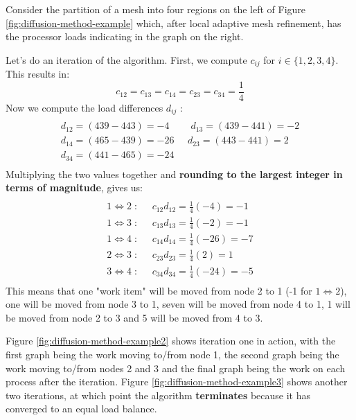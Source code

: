 \documentclass{article}
\begin{document}
Consider the partition of a mesh into four regions on the left of Figure \ref{fig:diffusion-method-example} which, after local adaptive mesh refinement, has the processor loads indicating in the graph on the right.

Let's do an iteration of the algorithm. First, we compute $c_{ij}$ for $i \in \lbrace 1, 2, 3, 4 \rbrace$. This results in:
\begin{equation}
	c_{12} = c_{13} = c_{14} = c_{23} = c_{34} = \frac{1}{4}
\end{equation}
Now we compute the load differences $d_{ij}$ :
\begin{multline} \\
	d_{12} = (439 - 443) = -4 \;\;\;\;\;\;\;\; d_{13} = (439 - 441) = -2 \\
	d_{14} = (465 - 439) = -26 \;\;\;\;\; d_{23} = (443 - 441) = 2 \\
	d_{34} = (441 - 465) = -24 \\
\end{multline}
Multiplying the two values together and \textbf{rounding to the largest integer in terms of magnitude}, gives us:
\begin{multline} \\
	1 \iff 2 \; : \;\;\;\;\; c_{12}d_{12} = \frac{1}{4}(-4) = -1 \\
	1 \iff 3 \; : \;\;\;\;\; c_{13}d_{13} = \frac{1}{4}(-2) = -1 \\
	1 \iff 4 \; : \;\;\;\;\; c_{14}d_{14} = \frac{1}{4}(-26) = -7 \\
	2 \iff 3 \; : \;\;\;\;\; c_{23}d_{23} = \frac{1}{4}(2) = 1 \\
	3 \iff 4 \; : \;\;\;\;\; c_{34}d_{34} = \frac{1}{4}(-24) = -5 \\
\end{multline}
This means that one "work item" will be moved from node 2 to 1 (-1 for $1 \iff 2$), one will be moved from node 3 to 1, seven will be moved from node 4 to 1, 1 will be moved from node 2 to 3 and 5 will be moved from 4 to 3.

Figure \ref{fig:diffusion-method-example2} shows iteration one in action, with the first graph being the work moving to/from node 1, the second graph being the work moving to/from nodes 2 and 3 and the final graph being the work on each process after the iteration. Figure \ref{fig:diffusion-method-example3} shows another two iterations, at which point the algorithm \textbf{terminates} because it has converged to an equal load balance.
\end{document}
